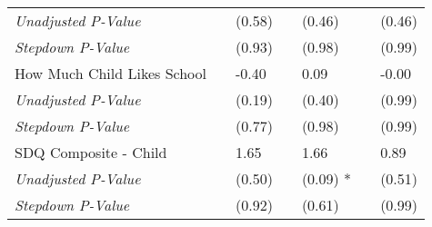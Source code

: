 \begin{tabular}{L{9cm} L{1cm} l L{1cm} l l l}
\quad \textit{Unadjusted P-Value} & & (0.58)  & & (0.46)  & & (0.46) \\
\quad \textit{Stepdown P-Value} & & (0.93)  & & (0.98)  & & (0.99) \\[3pt]
How Much Child Likes School & & -0.40 & & 0.09  & & -0.00 \\
\quad \textit{Unadjusted P-Value} & & (0.19)  & & (0.40)  & & (0.99) \\
\quad \textit{Stepdown P-Value} & & (0.77)  & & (0.98)  & & (0.99) \\[3pt]
SDQ Composite - Child & & 1.65 & & 1.66  & & 0.89 \\
\quad \textit{Unadjusted P-Value} & & (0.50)  & & (0.09) * & & (0.51) \\
\quad \textit{Stepdown P-Value} & & (0.92)  & & (0.61)  & & (0.99) \\[3pt]
\bottomrule
\end{tabular}
